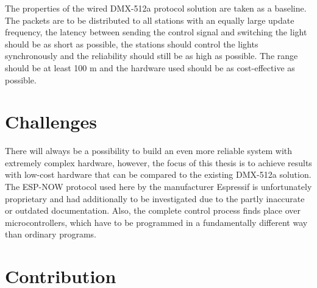 The properties of the wired DMX-512a protocol solution are taken as a baseline.
The packets are to be distributed to all stations with an equally large update frequency,
the latency between sending the control signal and switching the light should be as short as possible,
the stations should control the lights synchronously and the reliability should still be as high as possible.
The range should be at least 100 m and the hardware used should be as cost-effective as possible.

\section*{Challenges}

There will always be a possibility to build an even more reliable system with extremely complex hardware,
however, the focus of this thesis is to achieve results with low-cost hardware that can be compared 
to the existing DMX-512a solution.
The ESP-NOW protocol used here by the manufacturer Espressif is unfortunately proprietary
and had additionally to be investigated due to the partly inaccurate or outdated documentation.
Also, the complete control process finds place over microcontrollers, 
which have to be programmed in a fundamentally different way than ordinary programs.

\section*{Contribution}

